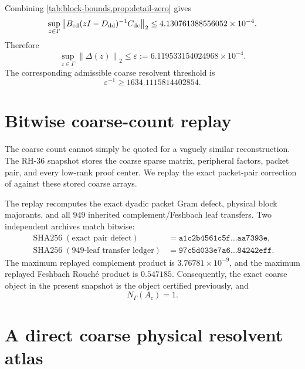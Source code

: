 \documentclass[11pt]{article}
\theoremstyle{definition}
\theoremstyle{remark}
\newcommand{\Id}{I}
\newcommand{\Ac}{A_{\mathrm c}}
\newcommand{\GammaC}{\Gamma}
\newcommand{\norm}[1]{\left\lVert #1\right\rVert}
\begin{document}
Combining \cref{tab:block-bounds,prop:detail-zero} gives
\begin{equation}
 \sup_{z\in\GammaC}
 \norm{B_{\rm cd}(z\Id-D_{\rm dd})^{-1}C_{\rm dc}}_2
 \le4.130761388556052\times10^{-4}.
 \label{eq:self-energy-bound}
\end{equation}
Therefore
\begin{equation}
 \boxed{
 \sup_{z\in\GammaC}\norm{\Delta(z)}_2
 \le\varepsilon
 :=6.119533154024968\times10^{-4}.}
 \label{eq:epsilon}
\end{equation}
The corresponding admissible coarse resolvent threshold is
\begin{equation}
 \varepsilon^{-1}\ge1634.1115814402854.
 \label{eq:threshold}
\end{equation}

\section{Bitwise coarse-count replay}
\label{sec:replay}

The coarse count cannot simply be quoted for a vaguely similar
reconstruction.  The RH-36 snapshot stores the coarse sparse matrix,
peripheral factors, packet pair, and every low-rank proof center.  We replay
the exact packet-pair correction of \citet{WangPacketPair2026} against these
stored coarse arrays.

The replay recomputes the exact dyadic packet Gram defect, physical block
majorants, and all \(949\) inherited complement/Feshbach leaf transfers.  Two
independent archives match bitwise:
\begin{align*}
 \operatorname{SHA256}(\text{exact pair defect})
 &=\texttt{a1c2b4561c5f\ldots aa7393e},\\
 \operatorname{SHA256}(\text{949-leaf transfer ledger})
 &=\texttt{97c5d033e7a6\ldots 84242eff}.
\end{align*}
The maximum replayed complement product is
\(3.76781\times10^{-9}\), and the maximum replayed Feshbach Rouch\'e product
is \(0.547185\).  Consequently, the exact coarse object in the present
snapshot is the object certified previously, and
\begin{equation}
 N_{\GammaC}(\Ac)=1.
 \label{eq:coarse-count}
\end{equation}

\section{A direct coarse physical resolvent atlas}
\label{sec:atlas}
\end{document}
